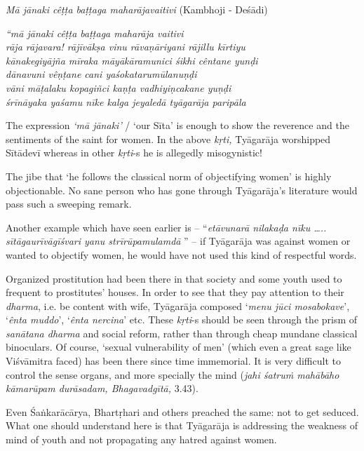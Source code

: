 \textit{Mā jānaki cêṭṭa baṭṭaga maharājavaitivi} (Kambhoji - Deśādi)

\begin{longquote}
\textit{“mā jānaki cêṭṭa baṭṭaga maharāja vaitivi}\\\textit{rāja rājavara! rājīvākṣa vinu rāvaṇāriyani rājillu kīrtiyu}\\\textit{kānakegiyājña mīraka māyākāramunici śikhi cêntane yunḍi}\\\textit{dānavuni vêṇṭane cani yaśokatarumūlanuṇḍi}\\ \textit{vāni māṭalaku kopagiñci kaṇṭa vadhiyiṇcakane yuṇḍi} \\\textit{śrīnāyaka yaśamu nīke kalga jeyaledā tyāgarāja paripāla}
\end{longquote}

The expression \textit{‘mā jānaki’} / ‘our Sīta’ is enough to show the reverence and the sentiments of the saint for women. In the above \textit{kṛti,} Tyāgarāja worshipped Sītādevī whereas in other \textit{kṛti}-s he is allegedly misogynistic! 

The jibe that ‘he follows the classical norm of objectifying women’ is highly objectionable. No sane person who has gone through Tyāgarāja’s literature would pass such a sweeping remark. 

Another example which have seen earlier is – “\textit{etāvunarā nilakaḍa nīku ….. sītāgaurīvāgīśvari yanu strīrūpamulamdā} ” – if Tyāgarāja was against women or wanted to objectify women, he would have not used this kind of respectful words.

Organized prostitution had been there in that society and some youth used to frequent to prostitutes’ houses. In order to see that they pay attention to their \textit{dharma}, i.e. be content with wife, Tyāgarāja composed ‘\textit{menu jūci mosabokave}’, ‘\textit{ênta muddo}’, ‘\textit{ênta nercina}’ etc. These \textit{kṛti}-s should be seen through the prism of \textit{sanātana dharma} and social reform, rather than through cheap mundane classical binoculars. Of course, ‘sexual vulnerability of men’ (which even a great sage like Viśvāmitra faced) has been there since time immemorial. It is very difficult to control the sense organs, and more specially the mind (\textit{jahi śatruṁ mahābāho kāmarūpam durāsadam, Bhagavadgītā,} 3.43).

Even Śaṅkarācārya, Bhartṛhari and others preached the same: not to get seduced. What one should understand here is that Tyāgarāja is addressing the weakness of mind of youth and not propagating any hatred against women.

